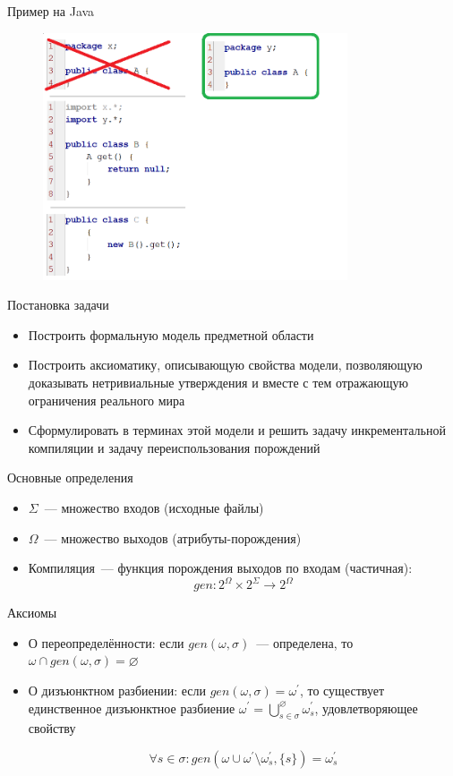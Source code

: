 \begin{frame}{Пример на Java}
\begin{figure}[!h]
	\centering
	\includegraphics[width=90mm]{state2.png}
\end{figure}
\end{frame}

\begin{frame}{Постановка задачи}
\begin{itemize}
	\addtolength{\itemsep}{12pt}
	\item Построить формальную модель предметной области
	\item Построить аксиоматику, описывающую свойства модели, позволяющую доказывать нетривиальные утверждения и вместе с тем отражающую ограничения реального мира
	\item Сформулировать в терминах этой модели и решить задачу инкрементальной компиляции и задачу переиспользования порождений
\end{itemize}
\end{frame}

\begin{frame}{Основные определения}

\begin{itemize}
	\addtolength{\itemsep}{12pt}
	\item $\Sigma$~--- множество входов (исходные файлы)
	\item $\Omega$~--- множество выходов (атрибуты-порождения)
	\item Компиляция~--- функция порождения выходов по входам (частичная): $$gen : 2^\Omega \times 2^\Sigma \to 2^\Omega$$
\end{itemize}
\end{frame}

\begin{frame}{Аксиомы}
\begin{itemize}
	\addtolength{\itemsep}{12pt}
	\item О переопределённости: если $gen(\omega,\sigma)$~--- определена, то $\omega\cap gen(\omega,\sigma) = \varnothing$
	
	\item О дизъюнктном разбиении: если $gen(\omega,\sigma) = \omega^\prime$, то существует единственное дизъюнктное разбиение $\omega^\prime=\bigcup^\varnothing_{s\in\sigma}\omega^\prime_s$, 
	удовлетворяющее свойству 

	$$\forall s\in\sigma : gen(\omega\cup\omega^\prime\setminus\omega^\prime_s,\{s\})=\omega^\prime_s$$
\end{itemize}
\end{frame}

